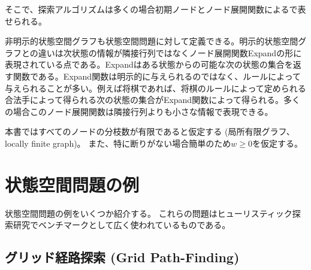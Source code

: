 そこで、探索アルゴリズムは多くの場合初期ノードとノード展開関数によるで表せられる。


非明示的状態空間グラフも状態空間問題に対して定義できる。明示的状態空間グラフとの違いは次状態の情報が隣接行列ではなくノード展開関数Expandの形に表現されている点である。Expandはある状態からの可能な次の状態の集合を返す関数である。Expand関数は明示的に与えられるのではなく、ルールによって与えられることが多い。例えば将棋であれば、将棋のルールによって定められる合法手によって得られる次の状態の集合がExpand関数によって得られる。多くの場合このノード展開関数は隣接行列よりも小さな情報で表現できる。

本書ではすべてのノードの分枝数が有限であると仮定する (局所有限グラフ、locally finite graph)。%
また、特に断りがない場合簡単のため$w \geq 0$を仮定する。




\section{状態空間問題の例}
\label{sec:search-problem}

状態空間問題の例をいくつか紹介する。
これらの問題はヒューリスティック探索研究でベンチマークとして広く使われているものである。



\subsection{グリッド経路探索 (Grid Path-Finding)}

